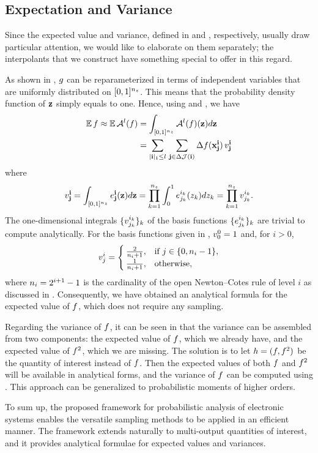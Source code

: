 \subsection{Expectation and Variance}
Since the expected value and variance, defined in  and
, respectively, usually draw particular attention, we would like
to elaborate on them separately; the interpolants that we construct have
something special to offer in this regard.

As shown in , $g$ can be reparameterized in terms of
independent variables that are uniformly distributed on $[0, 1]^{n_z}$. This means
that the probability density function of $\mathbf{z}$ simply equals to one. Hence,
using  and , we have
\begin{align*}
  \mathbb{E} \, f \approx \mathbb{E} \, \mathcal{A}^{l}(f) &= \int_{[0, 1]^{n_z}} \mathcal{A}^{l}(f)(\mathbf{z}) d\mathbf{z} \\
  &= \sum_{|\mathbf{i}|_1 \leq l} \, \sum_{\mathbf{j} \in \Delta\mathcal{J}(\mathbf{i})} \Delta f(\mathbf{x}^{\mathbf{i}}_{\mathbf{j}}) \, v^{\mathbf{i}}_{\mathbf{j}}
\end{align*}
where
\[
  v^{\mathbf{i}}_{\mathbf{j}} = \int_{[0, 1]^{n_z}} e^{\mathbf{i}}_{\mathbf{j}}(\mathbf{z}) d\mathbf{z} = \prod_{k = 1}^{{n_z}} \int_0^1 e^{i_k}_{j_k}(z_k) dz_k = \prod_{k = 1}^{{n_z}} v^{i_k}_{j_k}.
\]
The one-dimensional integrals $\{ v^{i_k}_{j_k} \}_k$ of the basis functions
$\{ e^{i_k}_{j_k} \}_k$ are trivial to compute analytically. For the basis
functions given in , $v^0_0 = 1$ and, for $i > 0$,
\[
  v^i_j = \begin{cases}
    \frac{2}{n_i + 1}, & \text{if } j \in \{ 0, n_i - 1 \}, \\
    \frac{1}{n_i + 1}, & \text{otherwise},
  \end{cases}
\]
where $n_i = 2^{i + 1} - 1$ is the cardinality of the open Newton--Cotes rule
of level $i$ as discussed in . Consequently, we have
obtained an analytical formula for the expected value of $f$, which does not
require any sampling.

Regarding the variance of $f$, it can be seen in  that the
variance can be assembled from two components: the expected value of $f$, which
we already have, and the expected value of $f^2$, which we are missing. The
solution is to let $h = (f, f^2)$ be the quantity of interest instead of $f$.
Then the expected values of both $f$ and $f^2$ will be available in analytical
forms, and the variance of $f$ can be computed using . This
approach can be generalized to probabilistic moments of higher orders.

To sum up, the proposed framework for probabilistic analysis of electronic
systems enables the versatile sampling methods to be applied in an efficient
manner. The framework extends naturally to multi-output quantities of interest,
and it provides analytical formulae for expected values and variances.
